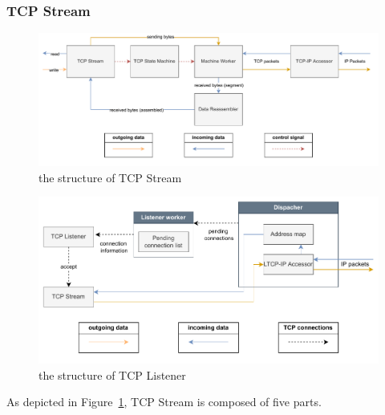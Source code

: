 \subsubsection{TCP Stream}
\begin{figure}[H]
  \begin{center}
    \centerline{\includegraphics[width=\columnwidth]{./figures/tcpstream.pdf}}
    \caption{the structure of TCP Stream}
    \label{tcpstream}
  \end{center}
\end{figure}
\begin{figure}[H]
  \begin{center}
    \centerline{\includegraphics[width=\columnwidth]{./figures/tcplistener}}
    \caption{the structure of TCP Listener}
    \label{tcplistener}
  \end{center}
\end{figure}
As depicted in Figure~\ref{tcpstream}, TCP Stream is composed of five parts.
